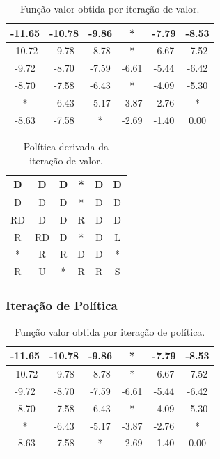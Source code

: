 \documentclass[a4paper,12pt]{article}
\begin{document}
\begin{table}[htbp]
\centering
\begin{tabular}{|c|c|c|c|c|c|}
\hline
-11.65 & -10.78 & -9.86 & *     & -7.79 & -8.53 \\
\hline
-10.72 & -9.78  & -8.78 & *     & -6.67 & -7.52 \\
\hline
-9.72  & -8.70  & -7.59 & -6.61 & -5.44 & -6.42 \\
\hline
-8.70  & -7.58  & -6.43 & *     & -4.09 & -5.30 \\
\hline
*      & -6.43  & -5.17 & -3.87 & -2.76 & *     \\
\hline
-8.63  & -7.58  & *     & -2.69 & -1.40 & 0.00  \\
\hline
\end{tabular}
\caption{Função valor obtida por iteração de valor.}
\end{table}

\begin{table}[htbp]
\centering
\begin{tabular}{|c|c|c|c|c|c|}
\hline
D   & D   & D   & *   & D   & D    \\
\hline
D   & D   & D   & *   & D   & D    \\
\hline
RD  & D   & D   & R   & D   & D    \\
\hline
R   & RD  & D   & *   & D   & L    \\
\hline
*   & R   & R   & D   & D   & *    \\
\hline
R   & U   & *   & R   & R   & S    \\
\hline
\end{tabular}
\caption{Política derivada da iteração de valor.}
\end{table}

\newpage
\subsubsection{Iteração de Política}

\begin{table}[htbp]
\centering
\begin{tabular}{|c|c|c|c|c|c|}
\hline
-11.65 & -10.78 & -9.86 & *     & -7.79 & -8.53 \\
\hline
-10.72 & -9.78  & -8.78 & *     & -6.67 & -7.52 \\
\hline
-9.72  & -8.70  & -7.59 & -6.61 & -5.44 & -6.42 \\
\hline
-8.70  & -7.58  & -6.43 & *     & -4.09 & -5.30 \\
\hline
*      & -6.43  & -5.17 & -3.87 & -2.76 & *     \\
\hline
-8.63  & -7.58  & *     & -2.69 & -1.40 & 0.00  \\
\hline
\end{tabular}
\caption{Função valor obtida por iteração de política.}
\end{table}
\end{document}
